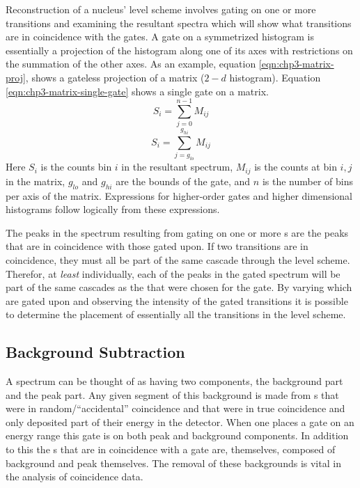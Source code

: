 Reconstruction of a nucleus' level scheme involves gating on one or more transitions and examining the resultant spectra which will show what transitions are in coincidence with the gates. A gate on a symmetrized histogram is essentially a projection of the histogram along one of its axes with restrictions on the summation of the other axes. As an example, equation \ref{eqn:chp3-matrix-proj}, shows a gateless projection of a matrix ($2-d$ histogram). Equation \ref{eqn:chp3-matrix-single-gate} shows a single gate on a matrix.
\begin{equation}
\label{eqn:chp3-matrix-proj}
S_i = \sum\limits_{j=0}^{n-1}M_{ij}
\end{equation}
\begin{equation}
\label{eqn:chp3-matrix-single-gate}
S_i = \sum\limits_{j=g_{lo}}^{g_{hi}}M_{ij}
\end{equation}
Here $S_i$ is the counts bin $i$ in the resultant spectrum, $M_{ij}$ is the counts at bin $i,j$ in the matrix, $g_{lo}$ and $g_{hi}$ are the bounds of the gate, and $n$ is the number of bins per axis of the matrix. Expressions for higher-order gates and higher dimensional histograms follow logically from these expressions.

The peaks in the spectrum resulting from gating on one or more \gr{}s are the peaks that are in coincidence with those gated upon. If two transitions are in coincidence, they must all be part of the same cascade through the level scheme. Therefor, at \emph{least} individually, each of the peaks in the gated spectrum will be part of the same cascades as the \gr{} that were chosen for the gate. By varying which \gr{} are gated upon and observing the intensity of the gated transitions it is possible to determine the placement of essentially all the \gr{} transitions in the level scheme.

\subsection{Background Subtraction}
\label{ssec:exp-pr-data-proc-bg-sub}
A spectrum can be thought of as having two components, the background part and the peak part. Any given segment of this background is made from \gr{}s that were in random/``accidental'' coincidence and \gr{} that were in true coincidence and only deposited part of their energy in the detector. When one places a gate on an energy range this gate is on both peak and background components. In addition to this the \gr{}s that are in coincidence with a gate are, themselves, composed of background and peak themselves. The removal of these backgrounds is vital in the analysis of \gr{} coincidence data.

